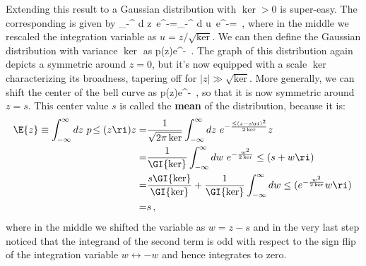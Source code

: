 Extending this result to a Gaussian distribution with  $\ker>0$ is super-easy. The corresponding  is given by 
\be\label{eq:single_Gauss}
\GI{\ker}\equiv  \int_{-\infty}^{\infty} d z\ e^{-}=\sqrt{\ker}\int_{-\infty}^{\infty} d u\ e^{-}=\sqrt{2\pi \ker}\, ,
\ee
where in the middle we rescaled the integration variable as $u=z/\sqrt{\ker}$. We can then define the Gaussian distribution with variance $\ker$ as
\be\label{eq:single_Gauss_with_mean}
p\!\le(z\ri)\equiv{}e^{-}\, .
\ee
The graph of this distribution again depicts a  symmetric around $z=0$, but it's now equipped with a scale $\ker$ characterizing its broadness, tapering off for $\vert z \vert\gg\sqrt{\ker}$.
More generally, we can shift the center of the bell curve as
\be\label{eq:Gaussian-with-mean}
p\!\le(z\ri)\equiv{}e^{-}\, ,
\ee
so that it is now symmetric around $z=s$.
This center value $s$ is called the \textbf{mean} of the distribution, because it is:
\begin{align}
\E{z}\equiv \int_{-\infty}^{\infty} d z\ p\!\le(z\ri) z=&\frac{1}{\sqrt{2\pi\ker}} \int_{-\infty}^{\infty}d z\  e^{-\frac{\le(z-s\ri)^2}{2\ker}} z\, \\
=&\frac{1}{\GI{\ker}} \int_{-\infty}^{\infty}d w\ e^{-\frac{w^2}{2\ker}} \le(s+w\ri)\, \nonumber\\
=&\frac{s\GI{\ker}}{\GI{\ker}}+\frac{1}{\GI{\ker}}  \int_{-\infty}^{\infty}d w \le(e^{-\frac{w^2}{2\ker}}w\ri)\, \nonumber\\
=&s\, ,\nonumber
\end{align}
where in the middle we shifted the variable as $w=z-s$ and in the very last step noticed that the integrand of the second term is odd with respect to the sign flip  of the integration variable $w\leftrightarrow -w$ and hence integrates to zero.


